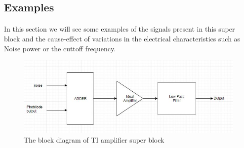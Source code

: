 \subsection{Examples}
\paragraph*{} In this section we will see some examples of the signals present in this super block and the cause-effect of variations in the electrical characteristics such as Noise power or the cuttoff frequency.
\begin{figure}[H]
	\centering
	\includegraphics[scale=0.75]{./lib/ti_amplifier/figures/diagram.png}
	\caption{The block diagram of TI amplifier super block}
	\label{fig:blocks}
\end{figure}

